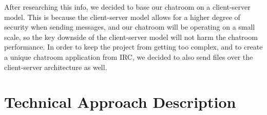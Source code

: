 \documentclass{article}
\begin{document}
After researching this info, we decided to base our chatroom on a client-server model. This is because the client-server model allows for a higher degree of security when sending messages, and our chatroom will be operating on a small scale, so the key downside of the client-server model will not harm the chatroom performance. In order to keep the project from getting too complex, and to create a unique chatroom application from IRC, we decided to also send files over the client-server architecture as well.

\section{Technical Approach Description}









\end{document}
